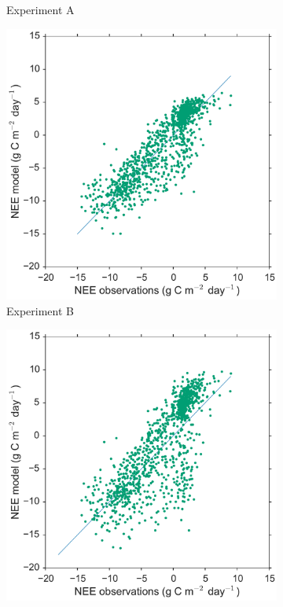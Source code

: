 \begin{figure}
\begin{subfigure}[b]{0.4\textwidth}
        \caption{Experiment A}
        \label{chap6:fig:forecastscatBR}
    \end{subfigure}
    \begin{subfigure}[b]{0.4\textwidth}
        \includegraphics[width=\textwidth]{chapter/chapter6/Bfscat2.pdf}
        \caption{Experiment B}
        \label{chap6:fig:forecastscatedcBR}
    \end{subfigure}
    \begin{subfigure}[b]{0.4\textwidth}
        \includegraphics[width=\textwidth]{chapter/chapter6/Cfscat2.pdf}

\end{subfigure}
\end{figure}
